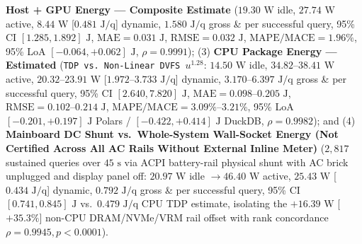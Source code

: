 \documentclass[10pt,a4paper]{article}
\begin{document}
\begin{enumerate}[leftmargin=1.5em,itemsep=0.8pt]
\textbf{Host + GPU Energy --- Composite Estimate} ($19.30\text{ W}$ idle, $27.74\text{ W}$ active, $8.44\text{ W}$ [$0.481\text{ J/q}$] dynamic, $1.580\text{ J/q}$ gross \& per successful query, 95\% CI $[1.285, 1.892]\text{ J}$, $\text{MAE}=0.031\text{ J}$, $\text{RMSE}=0.032\text{ J}$, $\text{MAPE/MACE}=1.96\%$, 95\% LoA $[-0.064,+0.062]\text{ J}$, $\rho=0.9991$); (3) \textbf{CPU Package Energy --- Estimated} (\texttt{TDP vs.\ Non-Linear DVFS $u^{1.28}$}: $14.50\text{ W}$ idle, $34.82\text{--}38.41\text{ W}$ active, $20.32\text{--}23.91\text{ W}$ [$1.972\text{--}3.733\text{ J/q}$] dynamic, $3.170\text{--}6.397\text{ J/q}$ gross \& per successful query, 95\% CI $[2.640, 7.820]\text{ J}$, $\text{MAE}=0.098\text{--}0.205\text{ J}$, $\text{RMSE}=0.102\text{--}0.214\text{ J}$, $\text{MAPE/MACE}=3.09\%\text{--}3.21\%$, 95\% LoA $[-0.201,+0.197]\text{ J}$ Polars / $[-0.422,+0.414]\text{ J}$ DuckDB, $\rho=0.9982$); and (4) \textbf{Mainboard DC Shunt vs.\ Whole-System Wall-Socket Energy (Not Certified Across All AC Rails Without External Inline Meter)} ($2{,}817$ sustained queries over $45\text{ s}$ via ACPI battery-rail physical shunt with AC brick unplugged and display panel off: $20.97\text{ W}$ idle $\rightarrow 46.40\text{ W}$ active, $25.43\text{ W}$ [$0.434\text{ J/q}$] dynamic, $0.792\text{ J/q}$ gross \& per successful query, 95\% CI $[0.741, 0.845]\text{ J}$ vs.\ $0.479\text{ J/q}$ CPU TDP estimate, isolating the $+16.39\text{ W}$ [$+35.3\%$] non-CPU DRAM/NVMe/VRM rail offset with rank concordance $\rho=0.9945, p<0.0001$).

\end{enumerate}
\end{document}
